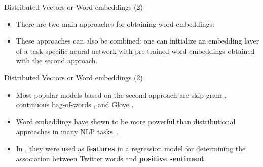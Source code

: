 \documentclass[handout]{beamer}
\begin{document}
\begin{frame}{Distributed Vectors or Word embeddings (2)}
\begin{scriptsize}
\begin{itemize}

\item There are two main approaches for obtaining word embeddings:

\begin{enumerate}
\end{enumerate}


\item These approaches can also be combined: one can initialize an embedding layer of a task-specific neural network with pre-trained word embeddings obtained with the second approach.

\end{itemize}
\end{scriptsize}
\end{frame}


\begin{frame}{Distributed Vectors or Word embeddings (2)}
\begin{scriptsize}
\begin{itemize}


\item Most popular models based on the second approach are skip-gram \cite{Mikolov2013}, continuous bag-of-words \cite{Mikolov2013}, and Glove \cite{penningtonSM14}.

\item Word embeddings have shown to be more powerful than distributional approaches in many NLP tasks~\cite{baroni2014don}.

\item In \cite{amir2015SemEval}, they were used as \textbf{features} in a regression model for determining the association between Twitter words and \textbf{positive sentiment}. 

\end{itemize}
\end{scriptsize}
\end{frame}
\end{document}
